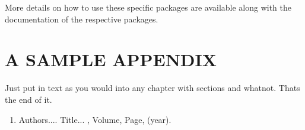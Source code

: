 \documentclass[MTech]{iitmdiss}
\begin{document}
More details on how to use these specific packages are available along
with the documentation of the respective packages.


\appendix

\chapter{A SAMPLE APPENDIX}

Just put in text as you would into any chapter with sections and
whatnot.  Thats the end of it.


\begin{singlespace}
  
\end{singlespace}



\listofpapers

\begin{enumerate}  
\item Authors....  \newblock
 Title...
  , Volume,
  Page, (year).
\end{enumerate}  
\end{document}
